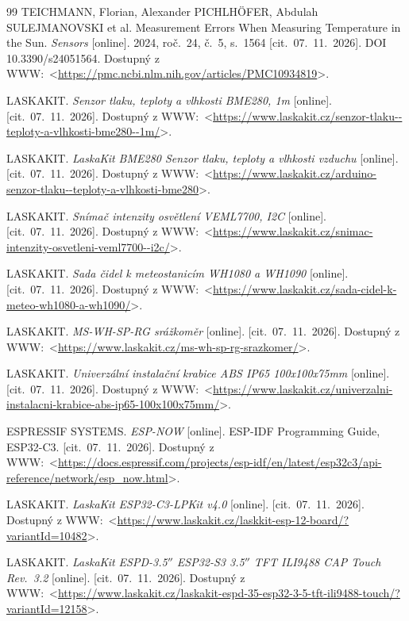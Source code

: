 \documentclass[oneside]{ctuthesis}
\theoremstyle{plain}
\theoremstyle{definition}
\theoremstyle{note}
\begin{document}
\begin{thebibliography}{99}
 TEICHMANN, Florian, Alexander PICHLHÖFER, Abdulah SULEJMANOVSKI et al. Measurement Errors When Measuring Temperature in the Sun. \textit{Sensors} [online]. 2024, roč.~24, č.~5, s.~1564 [cit.~07.~11.~2026]. DOI 10.3390/s24051564. Dostupný z WWW:~<\url{https://pmc.ncbi.nlm.nih.gov/articles/PMC10934819}>.

 LASKAKIT. \textit{Senzor tlaku, teploty a vlhkosti BME280, 1m} [online]. [cit.~07.~11.~2026]. Dostupný z WWW:~<\url{https://www.laskakit.cz/senzor-tlaku--teploty-a-vlhkosti-bme280--1m/}>.

 LASKAKIT. \textit{LaskaKit BME280 Senzor tlaku, teploty a vlhkosti vzduchu} [online]. [cit.~07.~11.~2026]. Dostupný z WWW:~<\url{https://www.laskakit.cz/arduino-senzor-tlaku--teploty-a-vlhkosti-bme280}>.

 LASKAKIT. \textit{Snímač intenzity osvětlení VEML7700, I2C} [online]. [cit.~07.~11.~2026]. Dostupný z WWW:~<\url{https://www.laskakit.cz/snimac-intenzity-osvetleni-veml7700--i2c/}>.

 LASKAKIT. \textit{Sada čidel k meteostanicím WH1080 a WH1090} [online]. [cit.~07.~11.~2026]. Dostupný z WWW:~<\url{https://www.laskakit.cz/sada-cidel-k-meteo-wh1080-a-wh1090/}>.

 LASKAKIT. \textit{MS-WH-SP-RG srážkoměr} [online]. [cit.~07.~11.~2026]. Dostupný z WWW:~<\url{https://www.laskakit.cz/ms-wh-sp-rg-srazkomer/}>.

 LASKAKIT. \textit{Univerzální instalační krabice ABS IP65 100x100x75mm} [online]. [cit.~07.~11.~2026]. Dostupný z WWW:~<\url{https://www.laskakit.cz/univerzalni-instalacni-krabice-abs-ip65-100x100x75mm/}>.

 ESPRESSIF SYSTEMS. \textit{ESP-NOW} [online]. ESP-IDF Programming Guide, ESP32-C3. [cit.~07.~11.~2026]. Dostupný z WWW:~<\url{https://docs.espressif.com/projects/esp-idf/en/latest/esp32c3/api-reference/network/esp_now.html}>.

 LASKAKIT. \textit{LaskaKit ESP32-C3-LPKit v4.0} [online]. [cit.~07.~11.~2026]. Dostupný z WWW:~<\url{https://www.laskakit.cz/laskkit-esp-12-board/?variantId=10482}>.

 LASKAKIT. \textit{LaskaKit ESPD-3.5$''$ ESP32-S3 3.5$''$ TFT ILI9488 CAP Touch Rev.~3.2} [online]. [cit.~07.~11.~2026]. Dostupný z WWW:~<\url{https://www.laskakit.cz/laskakit-espd-35-esp32-3-5-tft-ili9488-touch/?variantId=12158}>.


\end{thebibliography}
\end{document}
